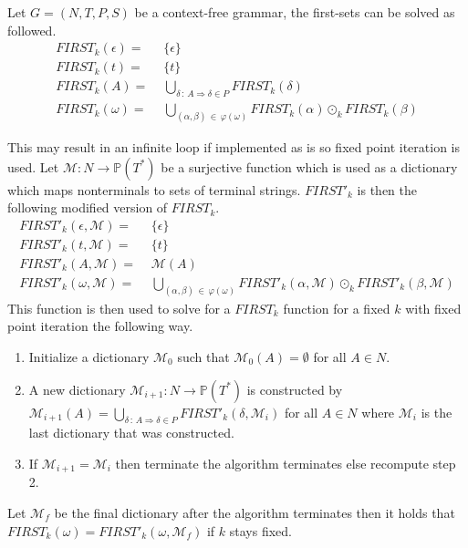 \begin{algorithm}
    Let $G = (N, T, P, S)$ be a context-free grammar, the first-sets can be solved as followed.
    \begin{align*}
        FIRST_k(\epsilon) =&\,\, \{\epsilon\} \\
        FIRST_k(t) =&\,\, \{t\} \\
        FIRST_k(A) =&\,\, \bigcup_{\delta \, : \, A \Rightarrow \delta \in P} FIRST_k(\delta) \\
        FIRST_k(\omega) =&\,\, \bigcup_{(\alpha, \beta) \, \in \, \varphi(\omega)} FIRST_k(\alpha) \odot_k FIRST_k(\beta)
    \end{align*}
\end{algorithm}
\noindent This may result in an infinite loop if implemented as is so fixed point iteration is used. Let $\mathcal{M}: N \to \mathbb{P}(T^*)$ be a surjective function which is used as a dictionary which maps nonterminals to sets of terminal strings. $FIRST'_k$ is then the following modified version of $FIRST_k$.
\begin{align*}
    FIRST'_k(\epsilon, \mathcal{M}) =&\,\, \{\epsilon\} \\
    FIRST'_k(t, \mathcal{M}) =&\,\, \{t\} \\
    FIRST'_k(A, \mathcal{M}) =&\,\, \mathcal{M}(A) \\
    FIRST'_k(\omega, \mathcal{M}) =&\,\, \bigcup_{(\alpha, \beta) \, \in \, \varphi(\omega)} FIRST'_k(\alpha, \mathcal{M}) \odot_k FIRST'_k(\beta, \mathcal{M})
\end{align*}
This function is then used to solve for a $FIRST_k$ function for a fixed $k$ with fixed point iteration the following way.
\begin{enumerate}
    \item Initialize a dictionary $\mathcal{M}_0$ such that $\mathcal{M}_0(A) = \emptyset$ for all $A \in N$.
    \item A new dictionary $\mathcal{M}_{i+1}: N \to \mathbb{P}(T^*)$ is constructed by $\mathcal{M}_{i+1}(A) = \bigcup_{\delta \, : \, A \Rightarrow \delta \in P} FIRST'_k(\delta, \mathcal{M}_{i})$ for all $A \in N$ where $\mathcal{M}_{i}$ is the last dictionary that was constructed.
    \item If $\mathcal{M}_{i + 1} = \mathcal{M}_{i}$ then terminate the algorithm terminates else recompute step 2.
\end{enumerate}
Let $\mathcal{M}_f$ be the final dictionary after the algorithm terminates then it holds that $FIRST_k(\omega) = FIRST'_k(\omega, \mathcal{M}_f)$ if $k$ stays fixed.
